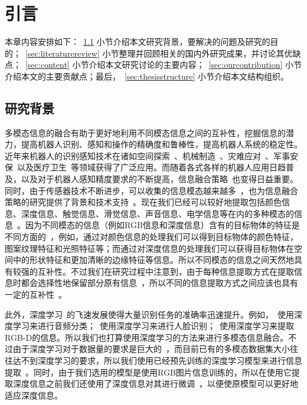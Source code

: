 \chapter{引言}
\label{cha:introduction}

本章内容安排如下：~\ref{sec:background} 小节介绍本文研究背景，要解决的问题及研究的目的；~\ref{sec:literaturereview} 小节整理并回顾相关的国内外研究成果，并讨论其优缺点；~\ref{sec:content} 小节介绍本文研究讨论的主要内容；~\ref{sec:ourcontribution} 小节介绍本文的主要贡献点；最后，~\ref{sec:thesisstructure} 小节介绍本文结构组织。

\section{研究背景}
\label{sec:background}

多模态信息的融合有助于更好地利用不同模态信息之间的互补性，挖掘信息的潜力，提高机器人识别、感知和操作的精确度和鲁棒性，提高机器人系统的稳定性。近年来机器人的识别感知技术在诸如空间探索~、机械制造~、灾难应对~、军事安保~以及医疗卫生~等领域获得了广泛应用。而随着各式各样的机器人应用日趋普及，以及对于机器人感知精度要求的不断提高，信息融合策略~也变得日益重要。同时，由于传感器技术不断进步，可以收集的信息模态越来越多~，也为信息融合策略的研究提供了背景和技术支持~。现在我们已经可以较好地提取包括颜色信息、深度信息、触觉信息、滑觉信息、声音信息、电学信息等在内的多种模态的信息~。因为不同模态的信息（例如RGB信息和深度信息）含有的目标物体的特征是不同方面的~，例如，通过对颜色信息的处理我们可以得到目标物体的颜色特征，图案纹理特征和光照特征等；而通过对深度信息的处理我们可以获得目标物体在空间中的形状特征和更加清晰的边缘特征等信息。所以不同模态的信息之间天然地具有较强的互补性。不过我们在研究过程中注意到，由于每种信息提取方式在提取信息时都会选择性地保留部分原有信息~，所以不同的信息提取方式之间应该也具有一定的互补性~。

此外，深度学习~的飞速发展使得大量识别任务的准确率迅速提升。例如，~使用深度学习来进行音频分类；~使用深度学习来进行人脸识别；~使用深度学习来提取RGB-D的信息。所以我们也打算使用深度学习的方法来进行多模态信息融合。不过由于深度学习对于数据量的要求是巨大的~，而目前已有的多模态数据集大小往往达不到深度学习的要求，所以我们使用已经预先训练的深度学习模型来进行信息提取~。同时，由于我们选用的模型是使用RGB图片信息训练的，所以在使用它提取深度信息之前我们还使用了深度信息对其进行微调~，以便使原模型可以更好地适应深度信息。

